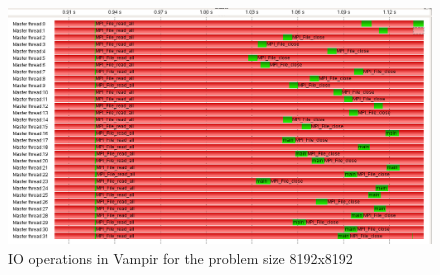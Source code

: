 \begin{enumerate}
 \begin{figure}[p] %
   \begin{center}
     \includegraphics[width=.9\linewidth]{Figures/io/io_vampir_biggest_size.png} %
     \caption{IO operations in Vampir for the problem size 8192x8192}
     \label{fig:par_io_vampir}
   \end{center}
 \end{figure}
 
\end{enumerate}

